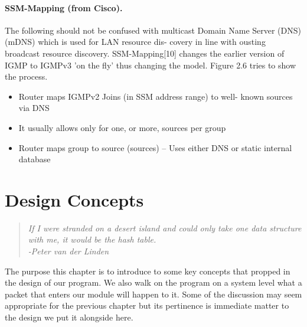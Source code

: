 \documentclass[11pt,left=2cm,bottom=2cm,oneside]{book}
\newcommand{\mquot}[1]{\begin{quotation}\textit{#1}\end{quotation}}
\begin{document}
\subsubsection{SSM-Mapping (from Cisco).} The following should not be confused with
multicast Domain Name Server (DNS) (mDNS) which is used for LAN resource dis-
covery in line with ousting broadcast resource discovery. SSM-Mapping[10]
changes
the earlier version of IGMP to IGMPv3 'on the fly' thus changing the model.
Figure
2.6 tries to show the process.
\begin{itemize}
\item Router maps IGMPv2 Joins (in SSM address range) to well- known sources
via DNS
\item It usually allows only for one, or more, sources per group
\item Router maps group to source (sources) – Uses either DNS or static internal
database
\end{itemize}
\chapter{Design Concepts}
\mquot{If I were stranded on a desert island and could only take one data
structure with me, it would be the hash table.\\
-Peter van der Linden\\
}
The purpose this chapter is to introduce to some key concepts that propped in
the
design of our program. We also walk on the program on a system level what a
packet that enters our module will happen to it. Some of the discussion may
seem
appropriate for the previous chapter but its pertinence is immediate matter to
the
design we put it alongside here.
\end{document}
